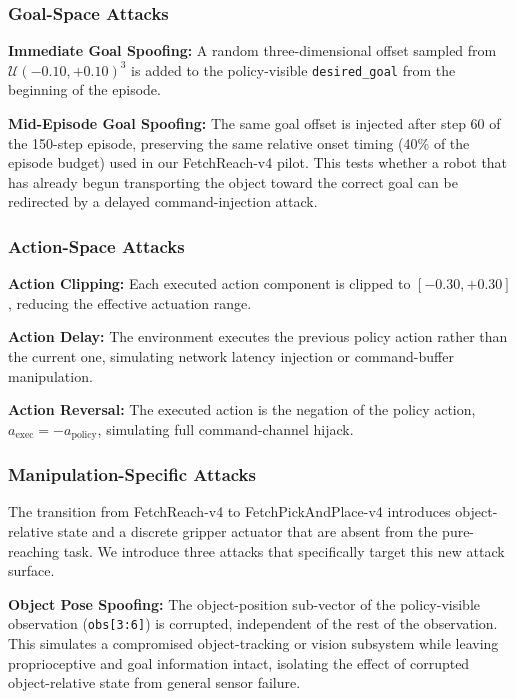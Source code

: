 \documentclass[conference]{IEEEtran}
\begin{document}
\subsubsection{Goal-Space Attacks}

\textbf{Immediate Goal Spoofing:} A random three-dimensional offset sampled from
$\mathcal{U}(-0.10,+0.10)^3$ is added to the policy-visible
\texttt{desired\_goal} from the beginning of the episode.

\textbf{Mid-Episode Goal Spoofing:} The same goal offset is injected after step 60 of
the 150-step episode, preserving the same relative onset timing (40\% of the episode
budget) used in our FetchReach-v4 pilot. This tests whether a robot that has already
begun transporting the object toward the correct goal can be redirected by a delayed
command-injection attack.

\subsubsection{Action-Space Attacks}

\textbf{Action Clipping:} Each executed action component is clipped to
$[-0.30,+0.30]$, reducing the effective actuation range.

\textbf{Action Delay:} The environment executes the previous policy action rather than
the current one, simulating network latency injection or command-buffer manipulation.

\textbf{Action Reversal:} The executed action is the negation of the policy action,
$a_{\mathrm{exec}} = -a_{\mathrm{policy}}$, simulating full command-channel hijack.

\subsubsection{Manipulation-Specific Attacks}

The transition from FetchReach-v4 to FetchPickAndPlace-v4 introduces object-relative
state and a discrete gripper actuator that are absent from the pure-reaching task. We
introduce three attacks that specifically target this new attack surface.

\textbf{Object Pose Spoofing:} The object-position sub-vector of the policy-visible
observation (\texttt{obs[3:6]}) is corrupted, independent of the rest of the
observation. This simulates a compromised object-tracking or vision subsystem while
leaving proprioceptive and goal information intact, isolating the effect of corrupted
object-relative state from general sensor failure.
\end{document}
